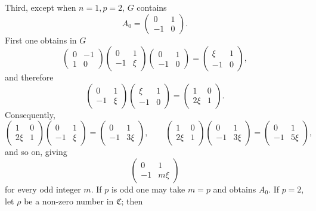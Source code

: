 \documentclass[11pt]{article}
\begin{document}
Third, except when $n=1,p=2$, $G$ contains
\[
 A_0=\begin{pmatrix}0&1\\-1&0\end{pmatrix}.
\]
First one obtains in $G$
\[
 \begin{pmatrix}0&-1\\1&0\end{pmatrix}
 \begin{pmatrix}0&1\\-1&\xi\end{pmatrix}
 \begin{pmatrix}0&1\\-1&0\end{pmatrix}
 =
 \begin{pmatrix}\xi&1\\-1&0\end{pmatrix},
\]
and therefore
\[
 \begin{pmatrix}0&1\\-1&\xi\end{pmatrix}
 \begin{pmatrix}\xi&1\\-1&0\end{pmatrix}
 =
 \begin{pmatrix}1&0\\2\xi&1\end{pmatrix}.
\]
Consequently,
\[
 \begin{pmatrix}1&0\\2\xi&1\end{pmatrix}
 \begin{pmatrix}0&1\\-1&\xi\end{pmatrix}
 =
 \begin{pmatrix}0&1\\-1&3\xi\end{pmatrix},\qquad
 \begin{pmatrix}1&0\\2\xi&1\end{pmatrix}
 \begin{pmatrix}0&1\\-1&3\xi\end{pmatrix}
 =
 \begin{pmatrix}0&1\\-1&5\xi\end{pmatrix},
\]
and so on, giving
\[
 \begin{pmatrix}0&1\\-1&m\xi\end{pmatrix}
\]
for every odd integer $m$. If $p$ is odd one may take $m=p$ and obtains $A_0$. If $p=2$, let $\rho$ be a non-zero number in $\mathfrak C$; then
\end{document}
